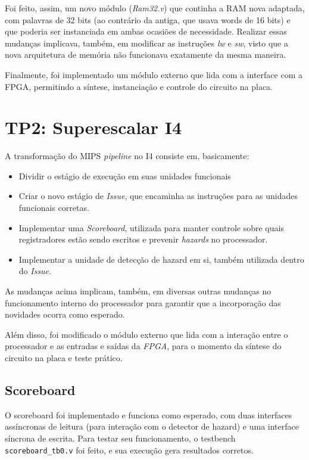\documentclass[12pt,a4paper]{article}
\numberwithin{equation}{section}
\begin{document}
Foi feito, assim, um novo módulo (\emph{Ram32.v}) que continha a RAM nova adaptada, com palavras de 32 bits (ao contrário da antiga, que usava words de 16 bits) e que poderia ser instanciada em ambas ocasiões de necessidade. Realizar essas mudanças implicava, também, em modificar as instruções \emph{lw} e \emph{sw}, visto que a nova arquitetura de memória não funcionava exatamente da mesma maneira.

Finalmente, foi implementado um módulo externo que lida com a interface com a FPGA, permitindo a síntese, instanciação e controle do circuito na placa.

\section{TP2: Superescalar I4}

A transformação do MIPS \emph{pipeline} no I4 consiste em, basicamente:

\begin{itemize}
    \item Dividir o estágio de execução em suas unidades funcionais
    \item Criar o novo estágio de \emph{Issue}, que encaminha as instruções para as unidades funcionais corretas.
    \item Implementar uma \emph{Scoreboard}, utilizada para manter controle sobre quais registradores estão sendo escritos e prevenir \emph{hazards} no processador.
    \item Implementar a unidade de detecção de hazard em si, também utilizada dentro do \emph{Issue}.
\end{itemize}

As mudanças acima implicam, também, em diversas outras mudanças no funcionamento interno do processador para garantir que a incorporação das novidades ocorra como esperado.

Além disso, foi modificado o módulo externo que lida com a interação entre o processador e as entradas e saídas da \emph{FPGA}, para o momento da síntese do circuito na placa e teste prático.

\subsection{Scoreboard}

O scoreboard foi implementado e funciona como esperado, com duas interfaces assíncronas de leitura (para interação com o detector de hazard) e uma interface síncrona de escrita. Para testar seu funcionamento, o testbench \verb|scoreboard_tb0.v| foi feito, e sua execução gera resultados corretos.
\end{document}
